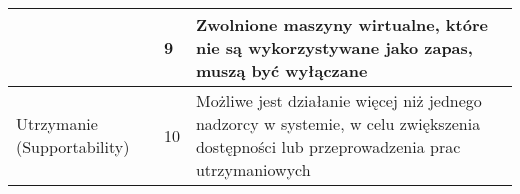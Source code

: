 \documentclass[../wstep.tex]{subfiles}
\begin{document}
\begin{longtable}{|p{}|p{}|p{}|}
                                                    & 9            & Zwolnione maszyny wirtualne, które nie są wykorzystywane jako zapas, muszą być wyłączane                                                                                                                                   \\ \hline
    \multirow[t]{3}{=}{Utrzymanie (Supportability)} & 10           & Możliwe jest działanie więcej niż jednego nadzorcy w systemie, w celu zwiększenia dostępności lub przeprowadzenia prac utrzymaniowych                                                                                      \\
\end{longtable}
\end{document}
